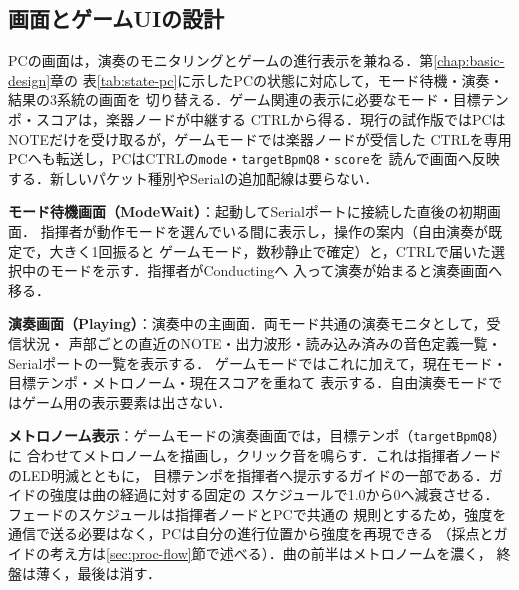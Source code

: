 \documentclass[lualatex,book,paper=a4paper,jafontsize=11.5pt,jafontscale=1.05]{jlreq}
\begin{document}
\subsection{画面とゲームUIの設計}\label{sec:pc-ui}
PCの画面は，演奏のモニタリングとゲームの進行表示を兼ねる．第\ref{chap:basic-design}章の
表\ref{tab:state-pc}に示したPCの状態に対応して，モード待機・演奏・結果の3系統の画面を
切り替える．ゲーム関連の表示に必要なモード・目標テンポ・スコアは，楽器ノードが中継する
CTRLから得る．現行の試作版ではPCはNOTEだけを受け取るが，ゲームモードでは楽器ノードが受信した
CTRLを専用PCへも転送し，PCはCTRLの\texttt{mode}・\texttt{targetBpmQ8}・\texttt{score}を
読んで画面へ反映する．新しいパケット種別やSerialの追加配線は要らない．

\textbf{モード待機画面（ModeWait）}：起動してSerialポートに接続した直後の初期画面．
指揮者が動作モードを選んでいる間に表示し，操作の案内（自由演奏が既定で，大きく1回振ると
ゲームモード，数秒静止で確定）と，CTRLで届いた選択中のモードを示す．指揮者がConductingへ
入って演奏が始まると演奏画面へ移る．

\textbf{演奏画面（Playing）}：演奏中の主画面．両モード共通の演奏モニタとして，受信状況・
声部ごとの直近のNOTE・出力波形・読み込み済みの音色定義一覧・Serialポートの一覧を表示する．
ゲームモードではこれに加えて，現在モード・目標テンポ・メトロノーム・現在スコアを重ねて
表示する．自由演奏モードではゲーム用の表示要素は出さない．

\textbf{メトロノーム表示}：ゲームモードの演奏画面では，目標テンポ（\texttt{targetBpmQ8}）に
合わせてメトロノームを描画し，クリック音を鳴らす．これは指揮者ノードのLED明滅とともに，
目標テンポを指揮者へ提示するガイドの一部である．ガイドの強度は曲の経過に対する固定の
スケジュールで1.0から0へ減衰させる．フェードのスケジュールは指揮者ノードとPCで共通の
規則とするため，強度を通信で送る必要はなく，PCは自分の進行位置から強度を再現できる
（採点とガイドの考え方は\ref{sec:proc-flow}節で述べる）．曲の前半はメトロノームを濃く，
終盤は薄く，最後は消す．
\end{document}
